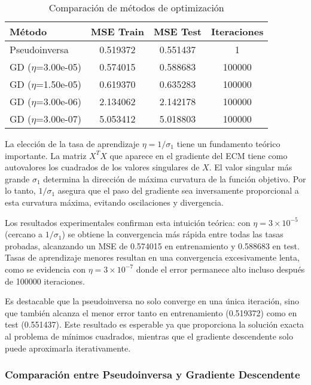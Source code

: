 \documentclass{tp02}
\begin{document}
\begin{table}[h]
\centering
\begin{tabular}{|l|c|c|c|}
\hline
Método & MSE Train & MSE Test & Iteraciones \\
\hline
Pseudoinversa & 0.519372 & 0.551437 & 1 \\
GD ($\eta$=3.00e-05) & 0.574015 & 0.588683 & 100000 \\
GD ($\eta$=1.50e-05) & 0.619370 & 0.635283 & 100000 \\
GD ($\eta$=3.00e-06) & 2.134062 & 2.142178 & 100000 \\
GD ($\eta$=3.00e-07) & 5.053412 & 5.018803 & 100000 \\
\hline
\end{tabular}
\caption{Comparación de métodos de optimización}
\label{tab:comparison}
\end{table}

La elección de la tasa de aprendizaje $\eta = 1/\sigma_1$ tiene un 
fundamento teórico importante. La matriz $X^TX$ que aparece en el 
gradiente del ECM tiene como autovalores los cuadrados de los valores 
singulares de $X$. El valor singular más grande $\sigma_1$ determina la 
dirección de máxima curvatura de la función objetivo. Por lo tanto, 
$1/\sigma_1$ asegura que el paso del gradiente sea inversamente 
proporcional a esta curvatura máxima, evitando oscilaciones y 
divergencia.

Los resultados experimentales confirman esta intuición teórica: con 
$\eta = 3\times10^{-5}$ (cercano a $1/\sigma_1$) se obtiene la 
convergencia más rápida entre todas las tasas probadas, alcanzando un 
MSE de 0.574015 en entrenamiento y 0.588683 en test. Tasas de 
aprendizaje menores resultan en una convergencia excesivamente lenta, 
como se evidencia con $\eta = 3\times10^{-7}$ donde el error permanece 
alto incluso después de 100000 iteraciones.

Es destacable que la pseudoinversa no solo converge en una única 
iteración, sino que también alcanza el menor error tanto en 
entrenamiento (0.519372) como en test (0.551437). Este resultado es 
esperable ya que proporciona la solución exacta al problema de mínimos 
cuadrados, mientras que el gradiente descendente solo puede aproximarla 
iterativamente.

\subsubsection{Comparación entre Pseudoinversa y Gradiente Descendente}
\end{document}
